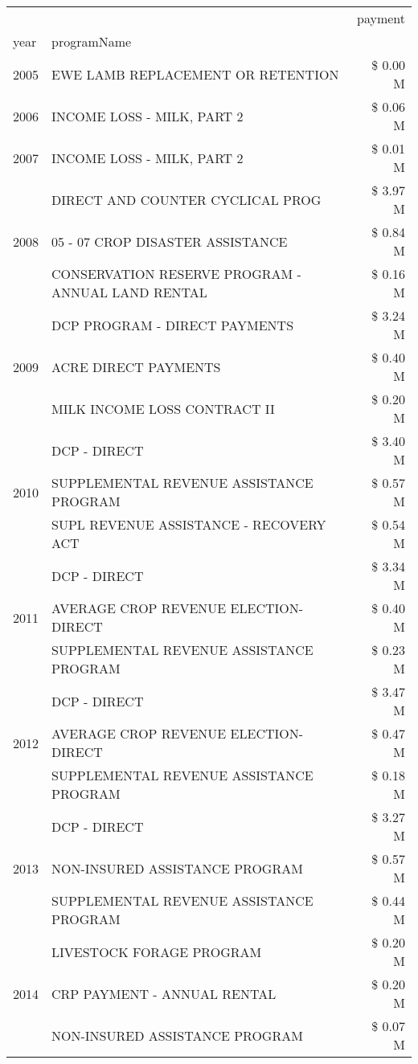 \begin{tabular}{llr}
\toprule
 &  & payment \\
year & programName &  \\
\midrule
2005 & EWE LAMB REPLACEMENT OR RETENTION & \$ 0.00 M \\
\cline{1-3}
2006 & INCOME LOSS - MILK, PART 2 & \$ 0.06 M \\
\cline{1-3}
2007 & INCOME LOSS - MILK, PART 2 & \$ 0.01 M \\
\cline{1-3}
\multirow[t]{3}{*}{2008} & DIRECT AND COUNTER CYCLICAL PROG & \$ 3.97 M \\
 & 05 - 07 CROP DISASTER ASSISTANCE & \$ 0.84 M \\
 & CONSERVATION RESERVE PROGRAM - ANNUAL LAND RENTAL & \$ 0.16 M \\
\cline{1-3}
\multirow[t]{3}{*}{2009} & DCP PROGRAM - DIRECT PAYMENTS & \$ 3.24 M \\
 & ACRE DIRECT PAYMENTS & \$ 0.40 M \\
 & MILK INCOME LOSS CONTRACT II & \$ 0.20 M \\
\cline{1-3}
\multirow[t]{3}{*}{2010} & DCP - DIRECT & \$ 3.40 M \\
 & SUPPLEMENTAL REVENUE ASSISTANCE PROGRAM & \$ 0.57 M \\
 & SUPL REVENUE ASSISTANCE - RECOVERY ACT & \$ 0.54 M \\
\cline{1-3}
\multirow[t]{3}{*}{2011} & DCP - DIRECT & \$ 3.34 M \\
 & AVERAGE CROP REVENUE ELECTION-DIRECT & \$ 0.40 M \\
 & SUPPLEMENTAL REVENUE ASSISTANCE PROGRAM & \$ 0.23 M \\
\cline{1-3}
\multirow[t]{3}{*}{2012} & DCP - DIRECT & \$ 3.47 M \\
 & AVERAGE CROP REVENUE ELECTION-DIRECT & \$ 0.47 M \\
 & SUPPLEMENTAL REVENUE ASSISTANCE PROGRAM & \$ 0.18 M \\
\cline{1-3}
\multirow[t]{3}{*}{2013} & DCP - DIRECT & \$ 3.27 M \\
 & NON-INSURED ASSISTANCE PROGRAM & \$ 0.57 M \\
 & SUPPLEMENTAL REVENUE ASSISTANCE PROGRAM & \$ 0.44 M \\
\cline{1-3}
\multirow[t]{3}{*}{2014} & LIVESTOCK FORAGE PROGRAM & \$ 0.20 M \\
 & CRP PAYMENT - ANNUAL RENTAL & \$ 0.20 M \\
 & NON-INSURED ASSISTANCE PROGRAM & \$ 0.07 M \\

\end{tabular}
